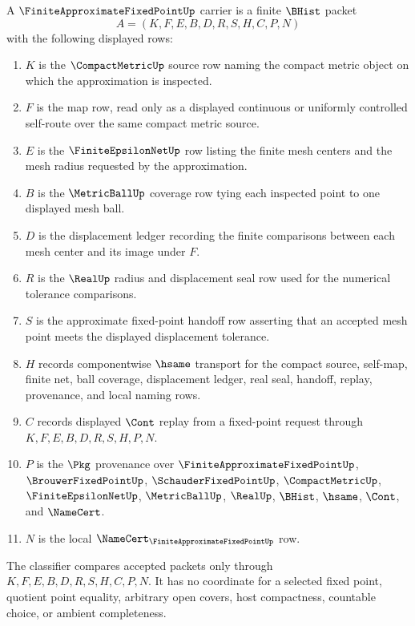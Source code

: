 \begin{definition}
\label{def:finite-approximate-fixed-point-carrier}
A $\FiniteApproximateFixedPointUp$ carrier is a finite $\BHist$ packet
$$
A=(K,F,E,B,D,R,S,H,C,P,N)
$$
with the following displayed rows:
\begin{enumerate}
\item $K$ is the $\CompactMetricUp$ source row naming the compact metric object on which the approximation is inspected.
\item $F$ is the map row, read only as a displayed continuous or uniformly controlled self-route over the same compact metric source.
\item $E$ is the $\FiniteEpsilonNetUp$ row listing the finite mesh centers and the mesh radius requested by the approximation.
\item $B$ is the $\MetricBallUp$ coverage row tying each inspected point to one displayed mesh ball.
\item $D$ is the displacement ledger recording the finite comparisons between each mesh center and its image under $F$.
\item $R$ is the $\RealUp$ radius and displacement seal row used for the numerical tolerance comparisons.
\item $S$ is the approximate fixed-point handoff row asserting that an accepted mesh point meets the displayed displacement tolerance.
\item $H$ records componentwise $\hsame$ transport for the compact source, self-map, finite net, ball coverage, displacement ledger, real seal, handoff, replay, provenance, and local naming rows.
\item $C$ records displayed $\Cont$ replay from a fixed-point request through $K,F,E,B,D,R,S,H,P,N$.
\item $P$ is the $\Pkg$ provenance over $\FiniteApproximateFixedPointUp$, $\BrouwerFixedPointUp$, $\SchauderFixedPointUp$, $\CompactMetricUp$, $\FiniteEpsilonNetUp$, $\MetricBallUp$, $\RealUp$, $\BHist$, $\hsame$, $\Cont$, and $\NameCert$.
\item $N$ is the local $\NameCert_{\FiniteApproximateFixedPointUp}$ row.
\end{enumerate}
The classifier compares accepted packets only through $K,F,E,B,D,R,S,H,C,P,N$. It has no coordinate for a selected fixed point, quotient point equality, arbitrary open covers, host compactness, countable choice, or ambient completeness.
\end{definition}

